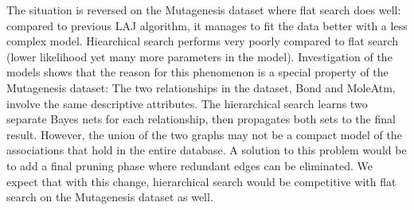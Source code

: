 \documentclass{article}
\begin{document}
 The situation is reversed on the Mutagenesis dataset where flat search does well: compared to previous LAJ algorithm, %
it manages to fit the data better with a less complex model. 
Hiearchical search performs very poorly compared to flat search (lower likelihood yet many more parameters in the model). Investigation of the models shows that the reason for this phenomenon is a special property of the Mutagenesis dataset: The two relationships in the dataset, Bond and MoleAtm, involve the same descriptive attributes. The hierarchical search learns two separate Bayes nets for each relationship, then propagates both sets to the final result. However, the union of the two graphs may not be a compact model of the associations that hold in the entire database. A solution to this problem would be to add a final pruning phase where redundant edges can be eliminated. We expect that with this change, hierarchical search would be competitive with flat search on the Mutagenesis dataset as well.
%

\end{document}
